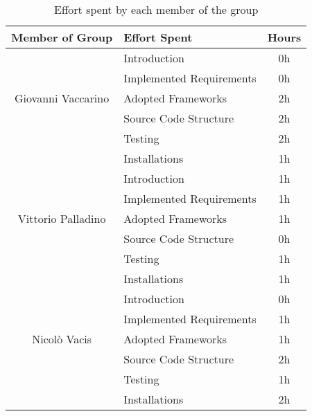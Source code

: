 \begin{table}[ht!]
\centering
\renewcommand{\arraystretch}{1.6}
\begin{tabular}{|c|l|c|}
\hline
\textbf{Member of Group} & \textbf{Effort Spent} & \textbf{Hours} \\ \hline
\multirow{5}{*}{Giovanni Vaccarino} 
    & Introduction & 0h \\ \cline{2-3}
    & Implemented Requirements & 0h \\ \cline{2-3}
    & Adopted Frameworks & 2h \\ \cline{2-3}
    & Source Code Structure & 2h \\ \cline{2-3}
    & Testing & 2h \\ \cline{2-3}
    & Installations & 1h \\ \hline
\multirow{5}{*}{Vittorio Palladino} 
    & Introduction & 1h \\ \cline{2-3}
    & Implemented Requirements & 1h \\ \cline{2-3}
    & Adopted Frameworks & 1h \\ \cline{2-3}
    & Source Code Structure & 0h \\ \cline{2-3}
    & Testing & 1h \\ \cline{2-3}
    & Installations & 1h \\ \hline
\multirow{5}{*}{Nicolò Vacis} 
    & Introduction & 0h \\ \cline{2-3}
    & Implemented Requirements & 1h \\ \cline{2-3}
    & Adopted Frameworks & 1h \\ \cline{2-3}
    & Source Code Structure & 2h \\ \cline{2-3}
    & Testing & 1h \\ \cline{2-3}
    & Installations & 2h \\ \hline
\end{tabular}
\caption{Effort spent by each member of the group}
\end{table}

